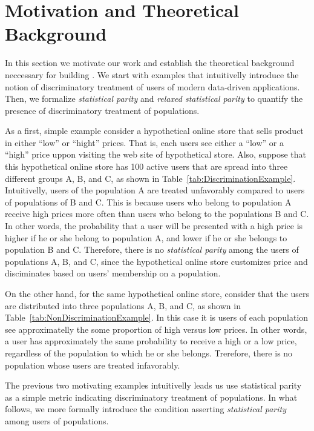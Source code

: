 \section{Motivation and Theoretical Background}
\label{sect:motivation}

In this section we motivate our work and establish the theoretical
background neccessary for building \sysname. We start with examples
that intuitivelly  introduce the notion of discriminatory treatment
of users of modern data-driven applications. Then, we formalize 
{\em statistical parity} and {\em relaxed statistical parity} to
quantify the presence of discriminatory treatment of populations.

As a first, simple example consider a hypothetical  online store that
sells product in either ``low'' or ``hight'' prices. That is, each
users see either a ``low'' or a ``high'' price uppon visiting the web
site of hypothetical store. Also, suppose that this hypothetical online
store has 100 active users that are spread into three different groups
A, B, and C, as shown in Table~\ref{tab:DiscriminationExample}.
Intuitivelly, users of
the population A are treated unfavorably compared to users of populations
of B and C. This is because users who belong to population A receive high
prices more often than users who belong to the populations B and C. In other
words, the probability that a user will be presented with a high price is
higher if he or she belong to population A, and lower if he or she belongs to
population B and C. Therefore, there is no {\em statistical parity} among the
users of populations A, B, and C, since the hypothetical online store
customizes price and disciminates based on users' membership on a population.

On the other hand, for the same hypothetical online store, consider
that the users are distributed into three populations A, B, and C, as
shown in Table~\ref{tab:NonDiscriminationExample}. In this case it is
users of each population see approximatelly the some proportion of high versus
low prices. In other words, a user has approximately the same probability to
receive a high or a low price, regardless of the population to which he or she
belongs. Trerefore, there is no population whose users are treated
infavorably.

The previous two motivating examples intuitivelly leads us use statistical
parity as a simple metric indicating discriminatory treatment of populations.
In what follows, we more formally introduce the condition asserting
{\em statistical parity} among users of populations.



